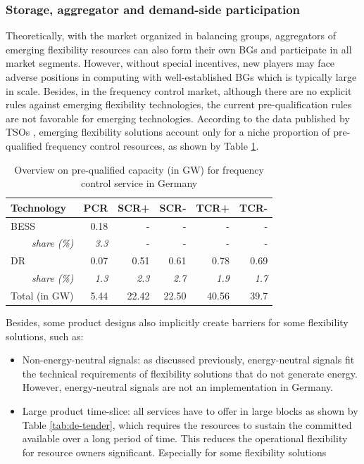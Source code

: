 \subsubsection{Storage, aggregator and demand-side participation}
Theoretically, with the market organized in balancing groups, aggregators of emerging flexibility resources can also form their own BGs and participate in all market segments. However, without special incentives, new players may face adverse positions in computing with well-established BGs which is typically large in scale. Besides, in the frequency control market, although there are no explicit rules against emerging flexibility technologies, the current pre-qualification rules are not favorable for emerging technologies. 
According to the data published by TSOs \cite{DE_as_web}, emerging flexibility solutions account only for a niche proportion of pre-qualified frequency control resources, as shown by Table \ref{tab:as-flexibility-share}.

\begin{table}[h!]
	\small
	\centering
	\begin{tabular}{l r r r r r}
		\hline
		\textbf{Technology} & \textbf{PCR} & \textbf{SCR+} & \textbf{SCR-} & \textbf{TCR+} & \textbf{TCR-} \\
		\hline
		BESS & 0.18 & - & - & -&-\\
		\multicolumn{1}{r}{\textit{share (\%)}} & \textit{3.3} & - & - & - & - \\
		DR & 0.07 & 0.51 & 0.61 & 0.78 & 0.69 \\
		\multicolumn{1}{r}{\textit{share (\%)}} & \textit{1.3} & \textit{2.3} & \textit{2.7} & \textit{1.9} & \textit{1.7} \\
		\hline
		Total (in GW) & 5.44 & 22.42 & 22.50&40.56& 39.7\\
		\hline
	\end{tabular}
\caption{Overview on pre-qualified capacity (in GW) for frequency control service in Germany}\label{tab:as-flexibility-share}
\end{table}

Besides, some product designs also implicitly create barriers for some flexibility solutions, such as:
\begin{itemize}
	\item Non-energy-neutral signals: as discussed previously, energy-neutral signals fit the technical requirements of flexibility solutions that do not generate energy. However, energy-neutral signals are not an implementation in Germany.
	\item Large product time-slice: all services have to offer in large blocks as shown by Table \ref{tab:de-tender}, which requires the resources to sustain the committed available over a long period of time. This reduces the operational flexibility for resource owners significant. Especially for some flexibility solutions 
\end{itemize}

